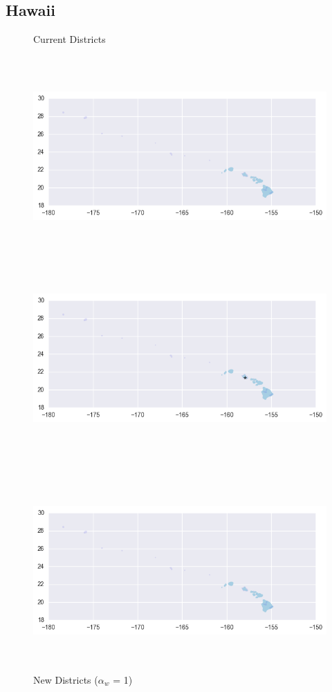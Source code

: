 \clearpage
\newpage

\subsection{Hawaii}
\begin{figure}[htb!] \centering
\caption{ Current Districts }
\includegraphics[width=5in,height=3in,keepaspectratio]{../maps/HI/static/before.png}
\includegraphics[width=5in,height=3in,keepaspectratio]{../maps/HI/static/0_0_after.png}
\caption{ New Districts ($\alpha_w$ = 1) }
\includegraphics[width=5in,height=3in,keepaspectratio]{../maps/HI/static/before.png}

\end{figure}

